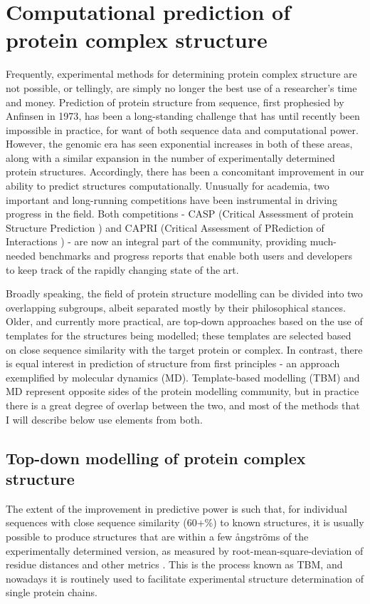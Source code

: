 \documentclass[a4paper,11pt,twoside,openright]{scrbook}
\begin{document}
\section{Computational prediction of protein complex structure}
Frequently, experimental methods for determining protein complex structure are
not possible, or tellingly, are simply no longer the best use of a researcher's
time and money. Prediction of protein structure from sequence, first prophesied
by Anfinsen in 1973\cite{Anfinsen1973}, has been a long-standing challenge that
has until recently been impossible in practice, for want of both sequence data
and computational power. However, the genomic era has seen exponential increases
in both of these areas, along with a similar expansion in the number of
experimentally determined protein structures. Accordingly, there has been a
concomitant improvement in our ability to predict structures computationally.
Unusually for academia, two important and long-running competitions have been
instrumental in driving progress in the field. Both competitions - CASP
(Critical Assessment of protein Structure Prediction \cite{Moult1995}) and CAPRI
(Critical Assessment of PRediction of Interactions \cite{Janin2003}) - are now
an integral part of the community, providing much-needed benchmarks and progress
reports that enable both users and developers to keep track of the rapidly
changing state of the art.

Broadly speaking, the field of protein structure modelling can be divided into
two overlapping subgroups, albeit separated mostly by their philosophical
stances. Older, and currently more practical, are top-down approaches based on
the use of templates for the structures being modelled; these templates are
selected based on close sequence similarity with the target protein or complex.
In contrast, there is equal interest in prediction of structure from first
principles - an approach exemplified by molecular dynamics (MD). Template-based
modelling (TBM) and MD represent opposite sides of the protein modelling
community, but in practice there is a great degree of overlap between the two,
and most of the methods that I will describe below use elements from both.

\subsection{Top-down modelling of protein complex structure}
The extent of the improvement in predictive power is such that, for individual
sequences with close sequence similarity (60+\%) to known structures, it is
usually possible to produce structures that are within a few ångströms of the
experimentally determined version, as measured by root-mean-square-deviation of
residue distances and other metrics \cite{Haas2013,Moult2016}. This is the
process known as TBM, and nowadays it is routinely used to facilitate
experimental structure determination of single protein chains.
\end{document}
